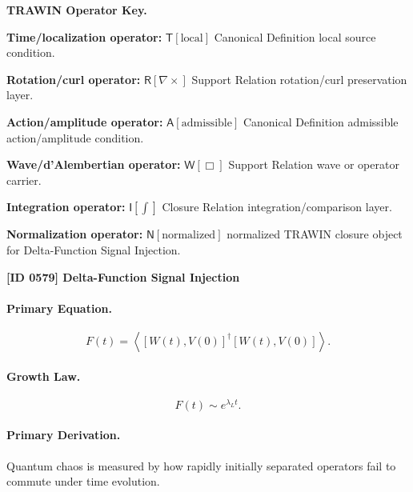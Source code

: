 \par\vspace{0.45\baselineskip}
\noindent\begin{minipage}[t]{\linewidth}
\begingroup
\small
\raggedright
\textbf{TRAWIN Operator Key.}\par
\noindent\textbf{Time/localization operator:} $\mathsf{T}\!\left[\mathrm{local}\right]$ Canonical Definition local source condition.\par
\noindent\textbf{Rotation/curl operator:} $\mathsf{R}\!\left[\nabla\times\right]$ Support Relation rotation/curl preservation layer.\par
\noindent\textbf{Action/amplitude operator:} $\mathsf{A}\!\left[\mathrm{admissible}\right]$ Canonical Definition admissible action/amplitude condition.\par
\noindent\textbf{Wave/d'Alembertian operator:} $\mathsf{W}\!\left[\Box\right]$ Support Relation wave or operator carrier.\par
\noindent\textbf{Integration operator:} $\mathsf{I}\!\left[\int\right]$ Closure Relation integration/comparison layer.\par
\noindent\textbf{Normalization operator:} $\mathsf{N}\!\left[\mathrm{normalized}\right]$ normalized TRAWIN closure object for Delta-Function Signal Injection.\par
\endgroup
\end{minipage}

\clearpage
\noindent\textbf{[ID 0579] Delta-Function Signal Injection}\par
\vspace{0.35em}
\paragraph{Primary Equation.}
\begin{equation}
F(t)
=
\left\langle
[W(t),V(0)]^\dagger
[W(t),V(0)]
\right\rangle .
\end{equation}

\paragraph{Growth Law.}
\begin{equation}
F(t)\sim e^{\lambda_L t}.
\end{equation}

\paragraph{Primary Derivation.}
Quantum chaos is measured by how rapidly initially separated operators fail to commute under time evolution.

